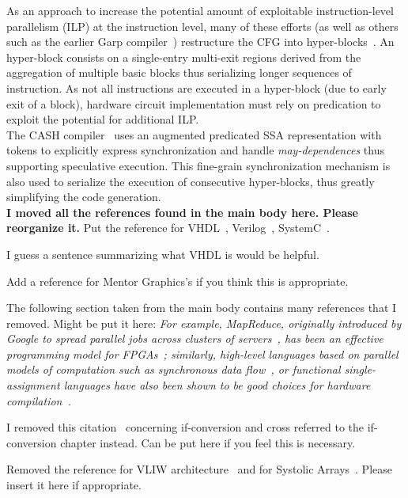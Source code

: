 As an approach to increase the potential amount of exploitable 
instruction-level parallelism (ILP) at the instruction level, 
many of these efforts (as well as others such as the earlier 
Garp compiler~\cite{Callahan:Computer00}) restructure the CFG 
into hyper-blocks~\cite{Mahlke:Micro92}. 
An hyper-block consists on a single-entry multi-exit regions derived from the 
aggregation of multiple basic blocks thus serializing longer sequences of 
instruction. As not all instructions are executed in a hyper-block (due to 
early exit of a block), hardware circuit implementation must rely on predication 
to exploit the potential for additional ILP. \\

The CASH compiler~\cite{Budiu:FPL02} uses an augmented predicated SSA
representation with tokens to explicitly express synchronization and handle 
{\em may-dependences} thus supporting speculative  execution. 
This fine-grain synchronization mechanism is also used to serialize 
the execution of consecutive hyper-blocks, thus greatly simplifying 
the code generation.\\

{\bf I moved all the references found in the main body here. Please reorganize it.}
Put the reference for VHDL~\cite{VHDLBook}, Verilog~\cite{VerilogBook}, SystemC~\cite{SystemC:ISSS01}.

I guess a sentence summarizing what VHDL is would be helpful.

Add a reference for Mentor Graphics's if you think this is appropriate.

The following section taken from the main body contains many references that I removed. Might be put it here: {\em 
For example, MapReduce, originally introduced by Google to spread parallel 
jobs across clusters of servers~\cite{Dean:CACM08}, has been an effective 
programming model for FPGAs~\cite{Yeung:FCCM08}; similarly, high-level 
languages based on parallel models of computation such as synchronous data 
flow~\cite{Lee:ProcIEEE87}, or functional single-assignment languages have 
also been shown to be good choices for hardware 
compilation~\cite{Hormati:CASES08,Hagiescu:DAC09,SAC:IJS02}.}

I removed this citation~\cite{Allen:POPL83} concerning if-conversion and cross referred to the if-conversion chapter instead. Can be put here if you feel this is necessary.

Removed the reference for VLIW architecture~\cite{CompilingVLIWBook} and for Systolic Arrays~\cite{CompilingSystolicArraysBook}. Please insert it here if appropriate.

